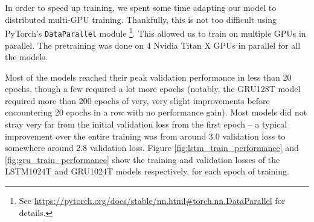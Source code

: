 \documentclass[a4paper,12pt]{article}
\begin{document}


In order to speed up training, we spent some time adapting our model to distributed multi-GPU training. Thankfully, this is not too difficult using PyTorch's \texttt{DataParallel} module \footnote{See \url{https://pytorch.org/docs/stable/nn.html\#torch.nn.DataParallel} for details.}. This allowed us to train on multiple GPUs in parallel. The pretraining was done on 4 Nvidia Titan X GPUs in parallel for all the models.

Most of the models reached their peak validation performance in less than 20 epochs, though a few required a lot more epochs (notably, the GRU128T model required more than 200 epochs of very, very slight improvements before encountering 20 epochs in a row with no performance gain). Most models did not stray very far from the initial validation loss from the first epoch -- a typical improvement over the entire training was from around 3.0 validation loss to somewhere around 2.8 validation loss. Figure \ref{fig:lstm_train_performance} and \ref{fig:gru_train_performance} show the training and validation losses of the LSTM1024T and GRU1024T models respectively, for each epoch of training.
\end{document}
